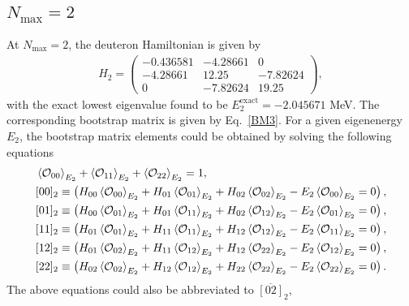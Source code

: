 \documentclass[aps,prc,reprint,superscriptaddress,nofootinbib]{revtex4-2}
\begin{document}
\begin{widetext}
\subsection{$N_\text{max}=2$}
\label{Nmax2}

At $N_\text{max}=2$, the deuteron Hamiltonian is given by
\begin{align}
H_2=\left(
\begin{array}{ccc}
-0.436581 & -4.28661 & 0 \\
-4.28661 & 12.25 & -7.82624 \\
0 & -7.82624 & 19.25
\end{array}
\right),
\end{align}
with the exact lowest eigenvalue found to be $E_2^{\text{exact}}=-2.045671$ MeV.
The corresponding bootstrap matrix is given by Eq.~\eqref{BM3}. For a given eigenenergy $E_2$,
the bootstrap matrix elements could be obtained by solving the following equations
\begin{align}
&\braket{\mathcal{O}_{00}}_{E_2}+\braket{\mathcal{O}_{11}}_{E_2}+\braket{\mathcal{O}_{22}}_{E_2}=1,\nonumber\\
&[00]_2\equiv\left(H_{00}\braket{\mathcal{O}_{00}}_{E_2}+H_{01}\braket{\mathcal{O}_{01}}_{E_2}+H_{02}\braket{\mathcal{O}_{02}}_{E_2}-E_2\braket{\mathcal{O}_{00}}_{E_2}=0\right),\nonumber\\
&[01]_2\equiv\left(H_{00}\braket{\mathcal{O}_{01}}_{E_2}+H_{01}\braket{\mathcal{O}_{11}}_{E_2}+H_{02}\braket{\mathcal{O}_{12}}_{E_2}-E_2\braket{\mathcal{O}_{01}}_{E_2}=0\right),\nonumber\\
&[11]_2\equiv\left(H_{01}\braket{\mathcal{O}_{01}}_{E_2}+H_{11}\braket{\mathcal{O}_{11}}_{E_2}+H_{12}\braket{\mathcal{O}_{12}}_{E_2}-E_2\braket{\mathcal{O}_{11}}_{E_2}=0\right),\nonumber\\
&[12]_2\equiv\left(H_{01}\braket{\mathcal{O}_{02}}_{E_2}+H_{11}\braket{\mathcal{O}_{12}}_{E_2}+H_{12}\braket{\mathcal{O}_{22}}_{E_2}-E_2\braket{\mathcal{O}_{12}}_{E_2}=0\right),\nonumber\\
&[22]_2\equiv\left(H_{02}\braket{\mathcal{O}_{02}}_{E_2}+H_{12}\braket{\mathcal{O}_{12}}_{E_2}+H_{22}\braket{\mathcal{O}_{22}}_{E_2}-E_2\braket{\mathcal{O}_{22}}_{E_2}=0\right).
\label{ConstN2}
\end{align}
The above equations could also be abbreviated to $\overline{[02]}_2$,

\end{widetext}
\end{document}
